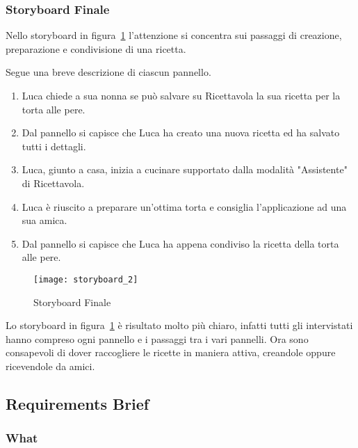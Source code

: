 \subsubsection{Storyboard Finale}

Nello storyboard in figura~\ref{fig:storyboard_2} l'attenzione si concentra sui passaggi di creazione, preparazione e condivisione di una ricetta.

Segue una breve descrizione di ciascun pannello.
\begin{enumerate}
  \item Luca chiede a sua nonna se può salvare su Ricettavola la sua ricetta per la torta alle pere.
  \item Dal pannello si capisce che Luca ha creato una nuova ricetta ed ha salvato tutti i dettagli.
  \item Luca, giunto a casa, inizia a cucinare supportato dalla modalità "Assistente" di Ricettavola.
  \item Luca è riuscito a preparare un'ottima torta e consiglia l'applicazione ad una sua amica.
  \item Dal pannello si capisce che Luca ha appena condiviso la ricetta della torta alle pere.
\end{enumerate}

\clearpage
\begin{figure}[!ht]
  \begin{center}
    \texttt{[image: storyboard\_2]}
    \caption{Storyboard Finale}
    \label{fig:storyboard_2}
  \end{center}
\end{figure}
\clearpage

Lo storyboard in figura~\ref{fig:storyboard_2} è risultato molto più chiaro, infatti tutti gli intervistati hanno compreso ogni pannello e i passaggi tra i vari pannelli.
Ora sono consapevoli di dover raccogliere le ricette in maniera attiva, creandole oppure ricevendole da amici.


\subsection{Requirements Brief}
\subsubsection{What}

